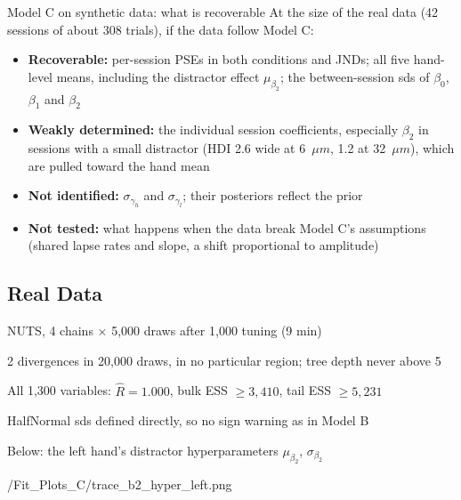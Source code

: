 \begin{frame}{Model C on synthetic data: what is recoverable}
  At the size of the real data (42 sessions of about 308 trials), if the data follow Model C:
  \begin{itemize}
    \item \textbf{Recoverable:} per-session PSEs in both conditions and JNDs; all five hand-level
          means, including the distractor effect $\mu_{\beta_2}$; the between-session sds of
          $\beta_0$, $\beta_1$ and $\beta_2$
    \item \textbf{Weakly determined:} the individual session coefficients, especially $\beta_2$
          in sessions with a small distractor (HDI 2.6 wide at 6~$\mu m$, 1.2 at 32~$\mu m$),
          which are pulled toward the hand mean
    \item \textbf{Not identified:} $\sigma_{\gamma_h}$ and $\sigma_{\gamma_l}$; their posteriors
          reflect the prior
    \item \textbf{Not tested:} what happens when the data break Model C's assumptions (shared
          lapse rates and slope, a shift proportional to amplitude)
  \end{itemize}
\end{frame}

\subsection{Real Data}

  {\item NUTS, 4 chains $\times$ 5{,}000 draws after 1{,}000 tuning (9 min)
   \item 2 divergences in 20{,}000 draws, in no particular region; tree depth never above 5
   \item All 1{,}300 variables: $\hat{R} = 1.000$, bulk ESS $\ge 3{,}410$, tail ESS $\ge 5{,}231$
   \item HalfNormal sds defined directly, so no sign warning as in Model B
   \item Below: the left hand's distractor hyperparameters $\mu_{\beta_2}$, $\sigma_{\beta_2}$}
  {\plotsC/Fit_Plots_C/trace_b2_hyper_left.png}

